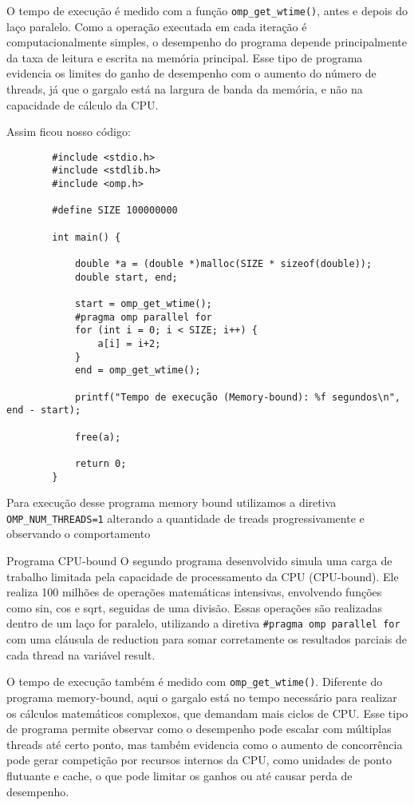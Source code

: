 \documentclass[a4paper, 12pt]{article}
\begin{document}
	O tempo de execução é medido com a função \texttt{omp\_get\_wtime()}, antes e depois do laço paralelo. Como a operação executada em cada iteração é computacionalmente simples, o desempenho do programa depende principalmente da taxa de leitura e escrita na memória principal. Esse tipo de programa evidencia os limites do ganho de desempenho com o aumento do número de threads, já que o gargalo está na largura de banda da memória, e não na capacidade de cálculo da CPU.
	
	Assim ficou nosso código:
	
	\begin{verbatim}
		#include <stdio.h>
		#include <stdlib.h>
		#include <omp.h>
		
		#define SIZE 100000000
		
		int main() {
			
			double *a = (double *)malloc(SIZE * sizeof(double));
			double start, end;
			
			start = omp_get_wtime();
			#pragma omp parallel for
			for (int i = 0; i < SIZE; i++) {
				a[i] = i+2;
			}
			end = omp_get_wtime();
			
			printf("Tempo de execução (Memory-bound): %f segundos\n", end - start);
			
			free(a);
			
			return 0;
		}
	\end{verbatim}
	
	Para execução desse programa memory bound utilizamos a diretiva \texttt{OMP\_NUM\_THREADS=1} alterando a quantidade de treads progressivamente e observando o comportamento 
	
	Programa CPU-bound
	O segundo programa desenvolvido simula uma carga de trabalho limitada pela capacidade de processamento da CPU (CPU-bound). Ele realiza 100 milhões de operações matemáticas intensivas, envolvendo funções como sin, cos e sqrt, seguidas de uma divisão. Essas operações são realizadas dentro de um laço for paralelo, utilizando a diretiva \texttt{\#pragma omp parallel for} com uma cláusula de reduction para somar corretamente os resultados parciais de cada thread na variável result.
	
	O tempo de execução também é medido com \texttt{omp\_get\_wtime()}. Diferente do programa memory-bound, aqui o gargalo está no tempo necessário para realizar os cálculos matemáticos complexos, que demandam mais ciclos de CPU. Esse tipo de programa permite observar como o desempenho pode escalar com múltiplas threads até certo ponto, mas também evidencia como o aumento de concorrência pode gerar competição por recursos internos da CPU, como unidades de ponto flutuante e cache, o que pode limitar os ganhos ou até causar perda de desempenho.
	
	
	
	
	
	
\end{document}
